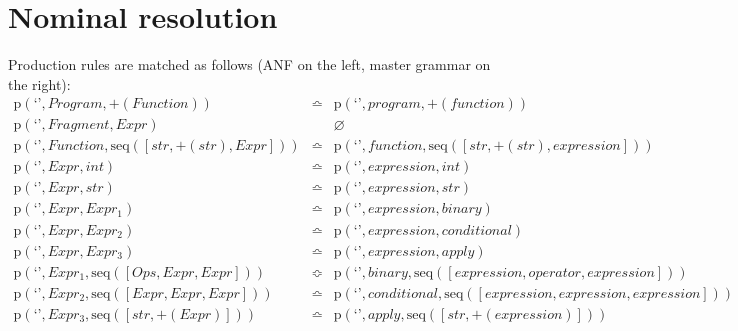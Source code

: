 \section{Nominal resolution}

Production rules are matched as follows (ANF on the left, master grammar on the right):
\begin{eqnarray*}
\mathrm{p}\left(\text{`'},\mathit{Program},\plus \left(\mathit{Function}\right)\right) & \bumpeq & \mathrm{p}\left(\text{`'},\mathit{program},\plus \left(\mathit{function}\right)\right) \\
\mathrm{p}\left(\text{`'},\mathit{Fragment},\mathit{Expr}\right) &  & \varnothing \\
\mathrm{p}\left(\text{`'},\mathit{Function},\mathrm{seq}\left(\left[str, \plus \left(str\right), \mathit{Expr}\right]\right)\right) & \bumpeq & \mathrm{p}\left(\text{`'},\mathit{function},\mathrm{seq}\left(\left[str, \plus \left(str\right), \mathit{expression}\right]\right)\right) \\
\mathrm{p}\left(\text{`'},\mathit{Expr},int\right) & \bumpeq & \mathrm{p}\left(\text{`'},\mathit{expression},int\right) \\
\mathrm{p}\left(\text{`'},\mathit{Expr},str\right) & \bumpeq & \mathrm{p}\left(\text{`'},\mathit{expression},str\right) \\
\mathrm{p}\left(\text{`'},\mathit{Expr},\mathit{Expr_1}\right) & \bumpeq & \mathrm{p}\left(\text{`'},\mathit{expression},\mathit{binary}\right) \\
\mathrm{p}\left(\text{`'},\mathit{Expr},\mathit{Expr_2}\right) & \bumpeq & \mathrm{p}\left(\text{`'},\mathit{expression},\mathit{conditional}\right) \\
\mathrm{p}\left(\text{`'},\mathit{Expr},\mathit{Expr_3}\right) & \bumpeq & \mathrm{p}\left(\text{`'},\mathit{expression},\mathit{apply}\right) \\
\mathrm{p}\left(\text{`'},\mathit{Expr_1},\mathrm{seq}\left(\left[\mathit{Ops}, \mathit{Expr}, \mathit{Expr}\right]\right)\right) & \Bumpeq & \mathrm{p}\left(\text{`'},\mathit{binary},\mathrm{seq}\left(\left[\mathit{expression}, \mathit{operator}, \mathit{expression}\right]\right)\right) \\
\mathrm{p}\left(\text{`'},\mathit{Expr_2},\mathrm{seq}\left(\left[\mathit{Expr}, \mathit{Expr}, \mathit{Expr}\right]\right)\right) & \bumpeq & \mathrm{p}\left(\text{`'},\mathit{conditional},\mathrm{seq}\left(\left[\mathit{expression}, \mathit{expression}, \mathit{expression}\right]\right)\right) \\
\mathrm{p}\left(\text{`'},\mathit{Expr_3},\mathrm{seq}\left(\left[str, \plus \left(\mathit{Expr}\right)\right]\right)\right) & \bumpeq & \mathrm{p}\left(\text{`'},\mathit{apply},\mathrm{seq}\left(\left[str, \plus \left(\mathit{expression}\right)\right]\right)\right) \\
\end{eqnarray*}
